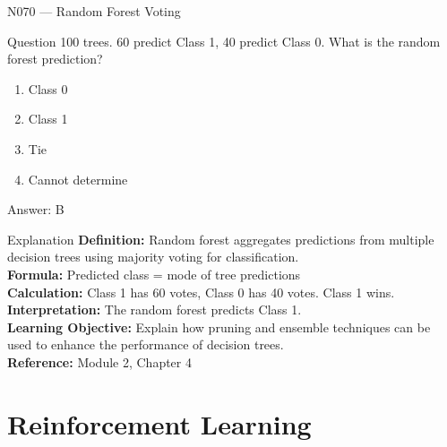 \documentclass[aspectratio=169,8pt]{beamer}
\begin{document}
	\begin{frame}{N070 --- Random Forest Voting}
		\begin{block}{Question}
			100 trees. 60 predict Class 1, 40 predict Class 0. What is the random forest prediction?
			\begin{enumerate}
				\item Class 0
				\item Class 1
				\item Tie
				\item Cannot determine
			\end{enumerate}
		\end{block}
		\begin{exampleblock}{Answer: B}\end{exampleblock}
		\begin{block}{Explanation}
			\textbf{Definition:} Random forest aggregates predictions from multiple decision trees using majority voting for classification.\\
			\textbf{Formula:} Predicted class = mode of tree predictions\\
			\textbf{Calculation:} Class 1 has 60 votes, Class 0 has 40 votes. Class 1 wins.\\
			\textbf{Interpretation:} The random forest predicts Class 1.\\
			\textbf{Learning Objective:} Explain how pruning and ensemble techniques can be used to enhance the performance of decision trees.\\
			\textbf{Reference:} Module 2, Chapter 4
		\end{block}
	\end{frame}
	
	\section{Reinforcement Learning}
	
\end{document}
